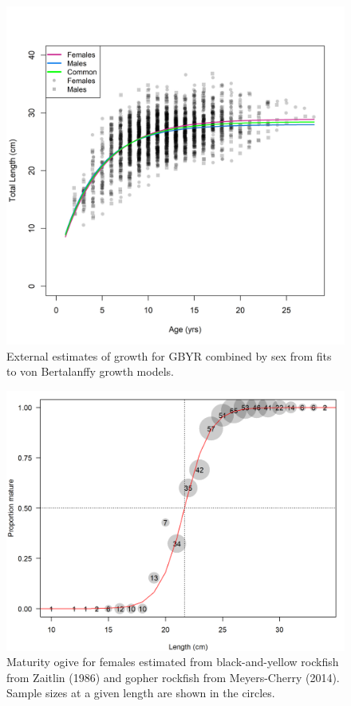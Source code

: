\documentclass[12pt,]{article}
\begin{document}
\begin{figure}
\centering
\includegraphics{Figures/Growth_by_sex.png}
\caption{External estimates of growth for GBYR combined by sex from fits
to von Bertalanffy growth models. \label{Growth_by_sex}}
\end{figure}

\begin{figure}
\centering
\includegraphics{Figures/GBY_maturity_ogive.png}
\caption{Maturity ogive for females estimated from black-and-yellow
rockfish from Zaitlin (1986) and gopher rockfish from Meyers-Cherry
(2014). Sample sizes at a given length are shown in the circles.
\label{fig:GBY_maturity_ogive}}
\end{figure}
\end{document}

